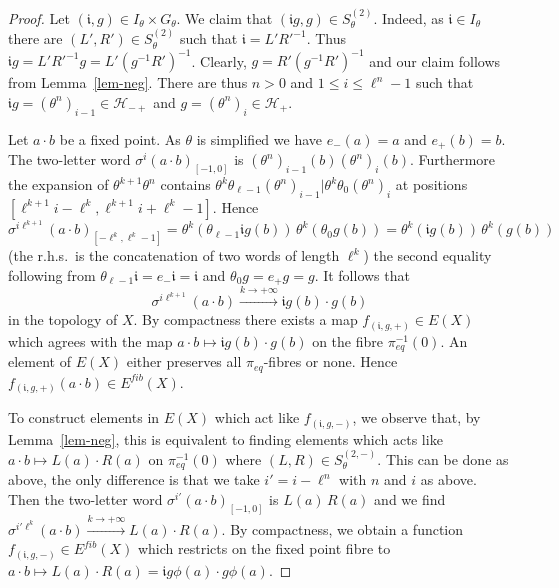 \documentclass[12pt]{amsart}
\theoremstyle{definition}
\numberwithin{equation}{section}
\newcommand{\ii}{{\mathfrak i}}
\newcommand{\Hh}{{\mathcal H}}
\newcommand{\pe}{\pi_{eq}}
\newcommand{\Ef}{E^{fib}}
\begin{document}
\begin{proof}
Let $(\ii ,g)\in I_\theta \times G_\theta$.
We claim that $(\ii g,g)\in S^{(2)}_\theta$. Indeed, as $\ii\in I_\theta$ there are 
$(L',R')\in S^{(2)}_\theta$ such that $\ii = L'{R'}^{-1}$. Thus
  $\ii g = L'{R'}^{-1}g = L'(g^{-1} R')^{-1}$. Clearly, $g = R' (g^{-1} R')^{-1}$ and our claim follows from Lemma~\ref{lem-neg}.
There are thus $n>0$ and $1\leq i\leq \ell^n-1$ such that
$ \ii g =(\theta^n)_{i-1}\in \Hh_{-+}$ and $g =(\theta^n)_i\in \Hh_+$.
 
Let $a\cdot b$ be a fixed point. As $\theta$ is simplified we have $e_{-}(a) = a$ and $e_{+}(b) = b$.
The two-letter word $\sigma^{i}(a\cdot b)_{[-1,0]}$ is $(\theta^n)_{i-1}(b)(\theta^n)_i(b)$. Furthermore 
the expansion of 
$\theta^{k+1}\theta^n$ contains $\theta^k\theta_{\ell-1} (\theta^n)_{i-1}| \theta^k\theta_0 (\theta^n)_{i}$ at positions  
 $[\ell^{k+1}i- \ell^k,\ell^{k+1}i+\ell^k-1]$.
Hence 
$$\sigma^{i\ell^{k+1}}(a\cdot b)_{[-\ell^k,\ell^k-1]} =\theta^k (\theta_{\ell-1} \ii g(b)) \,\theta^k (\theta_0  g(b)) = \theta^k (\ii g(b))\, \theta^k (g(b))$$
(the r.h.s.\ is the concatenation of two words of length $\ell^k$)  
the second equality following from $\theta_{\ell-1} \ii=e_-\ii = \ii$ and $ \theta_0 g=e_+ g = g$. 
It follows that    
$$\sigma^{i \ell^{k+1}}(a\cdot b)   \stackrel{k\to +\infty}\longrightarrow 
\ii g(b)\cdot g(b)$$
in the topology of $X$.
By compactness there exists a map $f_{(\ii ,g,+)}\in E(X)$ which agrees with the map 
$a\cdot b\mapsto \ii g(b)\cdot g(b)$ on the fibre $\pe^{-1}(0)$. An element of $E(X)$ either preserves all $\pe$-fibres or none. Hence 
$f_{(\ii ,g,+)}(a\cdot b)\in \Ef(X)$.

To construct elements in $E(X)$ which act like $f_{(\ii ,g,-)}$, we observe that, by Lemma~\ref{lem-neg}, this is equivalent to finding elements which acts like  
$a\cdot b\mapsto L(a)\cdot R(a)$ on $\pe^{-1}(0)$ where 
$(L,R)\in S^{(2,-)}_\theta$. This can be done as above, the only difference is that we take 
$i' = i-\ell^{n}$ with $n$ and $i$ as above. Then the two-letter word $\sigma^{i'}(a\cdot b)_{[-1,0]}$ is $L(a)\,R(a)$ and we find 
$\sigma^{i' \ell^k}(a\cdot b)   \stackrel{k\to +\infty}\longrightarrow 
L(a)\cdot R(a)$.  
By compactness, we obtain a function $f_{(\ii ,g,-)}\in \Ef(X)$ which restricts on the fixed point fibre to $a\cdot b\mapsto L(a)\cdot R(a) = \ii g \phi(a) \cdot g\phi(a)$.
\end{proof}
\end{document}
